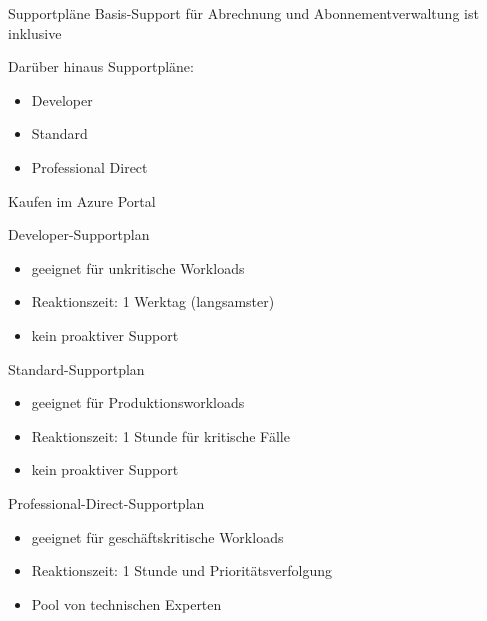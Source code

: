
\begin{flashcard}[\ ]{Supportpläne}
    Basis-Support für Abrechnung und Abonnementverwaltung ist inklusive

    \vspace{5mm}
    Darüber hinaus Supportpläne:
    \begin{itemize}
        \item Developer
        \item Standard
        \item Professional Direct
    \end{itemize}

    \vspace{5mm}
    Kaufen im Azure Portal
\end{flashcard}

\begin{flashcard}[Eigenschaften]{Developer-Supportplan}
    \begin{itemize}
        \item geeignet für unkritische Workloads
        \item Reaktionszeit: 1 Werktag (langsamster)
        \item kein proaktiver Support
    \end{itemize}
\end{flashcard}

\begin{flashcard}[Eigenschaften]{Standard-Supportplan}
    \begin{itemize}
        \item geeignet für Produktionsworkloads
        \item Reaktionszeit: 1 Stunde für kritische Fälle
        \item kein proaktiver Support
    \end{itemize}
\end{flashcard}

\begin{flashcard}[Eigenschaften]{Professional-Direct-Supportplan}
    \begin{itemize}
        \item geeignet für geschäftskritische Workloads
        \item Reaktionszeit: 1 Stunde und Prioritätsverfolgung
        \item Pool von technischen Experten
    \end{itemize}
\end{flashcard}

